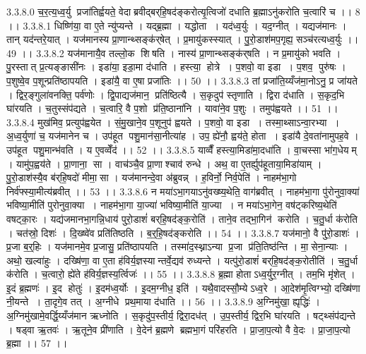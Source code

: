 3.3.8.0
च॒र॒त्य॒ध्व॒र्यु प्रजा॑तिर्ह्वयते॒ वेदाब्रवीद्बर्‌हि॒षद॑ङ्करोत्यृ॒त्विजो॑ दधाति ब्र॒ह्माऽनु॑करोति च॒त्वारि॑ च ।। 8 ।।
3.3.8.1
धिष्णि॑या॒ वा ए॒ते न्यु॑प्यन्ते । यद्ब्र॒ह्मा । यद्धोता । यद॑ध्व॒र्युः । यद॒ग्नीत् । यद्यज॑मानः । तान् यद॑न्तरे॒यात् । यज॑मानस्य प्रा॒णान्थ्सङ्क॑र्‌षेत् । प्र॒मायु॑कस्स्यात् । पु॒रो॒डाश॑मप॒गृह्य॒ सञ्च॑रत्यध्व॒र्युः ।। 49 ।।
3.3.8.2
यज॑मानायै॒व तल्लो॒क शि॑षति । नास्य॑ प्रा॒णान्थ्सङ्क॑र्‌षति । न प्र॒मायु॑को भवति । पु॒रस्तात् प्र॒त्यङ्ङासी॑नः । इडा॑या॒ इडा॒मा द॑धाति । हस्त्या॒॒ होत्रे । प॒शवो॒ वा इडा । प॒शव॒ पुरु॑षः । प॒शुष्वे॒व प॒शून्प्रति॑ष्ठापयति । इडा॑यै॒ वा ए॒षा प्रजा॑तिः ।। 50 ।।
3.3.8.3
तां प्रजा॑ति॒य्यँज॑मा॒नोऽनु॒ प्र जा॑यते । द्विर॒ङ्गुला॑वनक्ति॒ पर्व॑णोः । द्वि॒पाद्यज॑मान॒ प्रति॑ष्ठित्यै । स॒कृदुप॑ स्तृणाति । द्विरा द॑धाति । स॒कृद॒भि घा॑रयति । च॒तुस्संप॑द्यते । च॒त्वारि॒ वै प॒शो प्र॑ति॒ष्ठाना॑नि । यावा॑ने॒व प॒शुः । तमुप॑ह्वयते ।। 51 ।।
3.3.8.4
मुख॑मिव॒ प्रत्युप॑ह्वयेत । सं॒मु॒खाने॒व प॒शूनुप॑ ह्वयते । प॒शवो॒ वा इडा । तस्मा॒थ्साऽन्वा॒रभ्या । अ॒ध्व॒र्युणा॑ च॒ यज॑मानेन च । उप॑हूत पशु॒मान॑सा॒नीत्या॑ह । उप॒ ह्ये॑नौ॒ ह्वय॑ते॒ होता । इडा॑यै दे॒वता॑नामुपह॒वे । उप॑हूत पशु॒मान्भ॑वति । य ए॒वव्वेँद॑ ।। 52 ।।
3.3.8.5
याव्वैँ हस्त्या॒मिडा॑मा॒दधा॑ति । वा॒चस्सा भा॑ग॒धेयम् । यामु॑प॒ह्वय॑ते । प्रा॒णाना॒॒ सा । वाच॑ञ्चै॒व प्रा॒णाश्चाव॑ रुन्धे । अथ॒ वा ए॒तर्ह्युप॑हूताया॒मिडा॑याम् । पु॒रो॒डाश॑स्यै॒व ब॑र्‌हि॒षदो॑ मीमा॒॒सा । यज॑मानन्दे॒वा अ॑ब्रुवन्न् । ह॒विर्नो॒ निर्व॒पेति॑ । नाहम॑भा॒गो निर्व॑फ्स्या॒मीत्य॑ब्रवीत् ।। 53 ।।
3.3.8.6
न मया॑ऽभा॒गयाऽनु॑वख्ष्य॒थेति॒ वाग॑ब्रवीत् । नाहम॑भा॒गा पु॑रोनुवा॒क्या॑ भविष्या॒मीति॑ पुरोनुवा॒क्या । नाहम॑भा॒गा या॒ज्या॑ भविष्या॒मीति॑ या॒ज्या । न मया॑ऽभा॒गेन॒ वष॑ट्करिष्य॒थेति॑ वषट्का॒रः । यद्य॑जमानभा॒गन्नि॒धाय॑ पुरो॒डाशं॑ बर्‌हि॒षद॑ङ्क॒रोति॑ । ताने॒व तद्भा॒गिन॑ करोति । च॒तु॒र्धा क॑रोति । चत॑स्रो॒ दिशः॑ । दि॒ख्ष्वे॑व प्रति॑तिष्ठति । ब॒र्॒हि॒षद॑ङ्करोति ।। 54 ।।
3.3.8.7
यज॑मानो॒ वै पु॑रो॒डाशः॑ । प्र॒जा ब॒र्॒हिः । यज॑मानमे॒व प्र॒जासु॒ प्रति॑ष्ठापयति । तस्मा॑द॒स्थ्नाऽन्या प्र॒जा प्र॑ति॒तिष्ठ॑न्ति । मा॒॒सेना॒न्याः । अथो॒ खल्वा॑हुः । दख्षि॑णा॒ वा ए॒ता ह॑विर्य॒ज्ञस्यान्तर्वे॒द्यव॑ रुध्यन्ते । यत्पु॑रो॒डाशं॑ बर्‌हि॒षद॑ङ्क॒रोतीति॑ । च॒तु॒र्धा क॑रोति । च॒त्वारो॒ ह्ये॑ते ह॑विर्य॒ज्ञस्य॒र्त्विजः॑ ।। 55 ।।
3.3.8.8
ब्र॒ह्मा होताऽध्व॒र्युर॒ग्नीत् । तम॒भि मृ॑शेत् । इ॒दं ब्र॒ह्मणः॑ । इ॒द होतुः॑ । इ॒दम॑ध्व॒र्योः । इ॒दम॒ग्नीध॒ इति॑ । यथै॒वादस्सौ॒म्येऽध्व॒रे । आ॒देश॑मृ॒त्विग्भ्यो॒ दख्षि॑णा नी॒यन्ते । ता॒दृगे॒व तत् । अ॒ग्नीधे प्रथ॒माया द॑धाति ।। 56 ।।
3.3.8.9
अ॒ग्निमु॑खा॒ ह्यृद्धिः॑ । अ॒ग्निमु॑खामे॒वर्द्धि॒य्यँज॑मान ऋध्नोति । स॒कृदु॑प॒स्तीर्य॒ द्विरा॒दध॑त् । उ॒प॒स्तीर्य॒ द्विर॒भि घा॑रयति । षट्थ्संप॑द्यन्ते । षड्वा ऋ॒तवः॑ । ऋ॒तूने॒व प्री॑णाति । वे॒देन॑ ब्र॒ह्मणे ब्रह्मभा॒गं परि॑हरति । प्रा॒जा॒प॒त्यो वै वे॒दः । प्रा॒जा॒प॒त्यो ब्र॒ह्मा ।। 57 ।।
